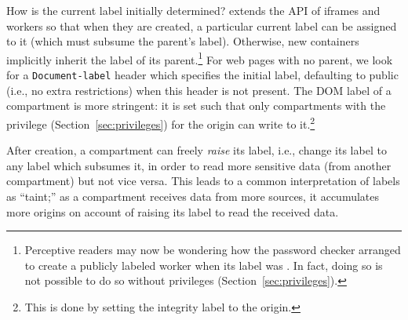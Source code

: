 %

How is the current label initially determined?
%
\sys{} extends the API of iframes and workers so that when they are
created, a particular current label can be assigned to it (which
must subsume the parent's label).  Otherwise, new containers implicitly
inherit the label of its parent.\footnote{Perceptive readers may now be wondering how
the password checker arranged to create a publicly labeled worker
when its label was .  In fact, doing so is not possible
to do so without privileges (Section~\ref{sec:privileges}).}
%
For web pages with no parent, we look for a {\tt Document-label} header which
specifies the initial label, defaulting to public (i.e., no extra
restrictions) when this header is not present.
%
The DOM label of a compartment is more stringent: it is set such that
only compartments with the privilege (Section~\ref{sec:privileges}) for the origin can write to
it.\footnote{This is done by setting the integrity label to the origin.}

After creation, a compartment can freely \emph{raise} its label, i.e.,
change its label to any label which subsumes it, in order to read more
sensitive data (from another compartment) but not vice versa.
%
This leads to a common interpretation of labels as ``taint;'' as
a compartment receives data from more sources, it accumulates more
origins on account of raising its label to read the received data.

